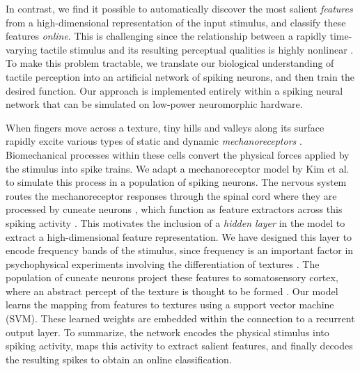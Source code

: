 In contrast, we find it possible to automatically discover the most salient {\it features} from a high-dimensional representation of the input stimulus, %
and classify these features {\it online}.  This is challenging since the relationship between a rapidly time-varying tactile stimulus and its resulting perceptual qualities is highly nonlinear \citep{weber2013spatial}. To make this problem tractable, we translate our biological understanding of tactile perception into an artificial network  of spiking neurons, and then train the desired function. Our approach  %
is implemented entirely within a spiking neural network that can be simulated on low-power neuromorphic hardware. 

%

When fingers move across a texture, tiny hills and valleys along its surface rapidly excite various types of static and dynamic {\it mechanoreceptors} \citep{weber2013spatial}. Biomechanical processes within these cells convert the physical forces applied by the stimulus into spike trains. We adapt a mechanoreceptor model by Kim et al. \citep{kim2011does} to simulate this process in a population of spiking neurons.  The nervous system routes the mechanoreceptor responses  through the spinal cord where they are  processed by cuneate neurons \citep{saal2014touch}, which function as feature extractors across this spiking activity   \citep{jorntell2014segregation}. This motivates the inclusion of a {\it hidden layer} in the model  to extract a high-dimensional feature representation. We have designed  this layer to encode frequency bands of the stimulus, since frequency is an important factor in psychophysical experiments involving the differentiation of textures \citep{unger2013physical}. 
The population of cuneate neurons project these features to somatosensory cortex, where an abstract percept of the texture is thought to be formed  \citep{jorntell2014segregation}. Our model  learns the mapping from features to textures using a support vector machine (SVM). These learned weights are embedded  within the connection to a recurrent output layer. To summarize, the network encodes the physical stimulus into spiking activity, maps this activity to extract salient features, and finally decodes the resulting spikes to obtain an online classification. 

